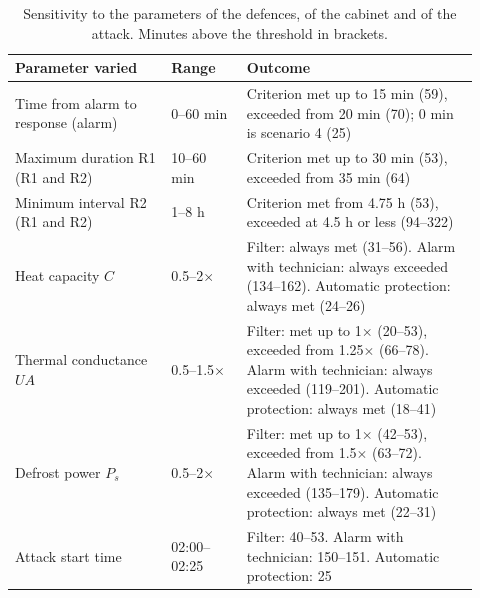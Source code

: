 \documentclass{ceurart}
\begin{document}
\begin{table}[ht]
  \caption{Sensitivity to the parameters of the defences, of the cabinet and of the attack. Minutes above the threshold in brackets.}
  \label{tab:sensitivity}
  \begin{tabular}{@{}p{0.31\linewidth}p{0.15\linewidth}p{0.46\linewidth}@{}}
    \toprule
    Parameter varied & Range & Outcome \\
    \midrule
    Time from alarm to response (alarm) & 0--60 min & Criterion met up to 15 min (59), exceeded from 20 min (70); 0 min is scenario 4 (25) \\
    Maximum duration R1 (R1 and R2) & 10--60 min & Criterion met up to 30 min (53), exceeded from 35 min (64) \\
    Minimum interval R2 (R1 and R2) & 1--8 h & Criterion met from 4.75 h (53), exceeded at 4.5 h or less (94--322) \\
    Heat capacity $C$ & 0.5--2$\times$ & Filter: always met (31--56). Alarm with technician: always exceeded (134--162). Automatic protection: always met (24--26) \\
    Thermal conductance $UA$ & 0.5--1.5$\times$ & Filter: met up to 1$\times$ (20--53), exceeded from 1.25$\times$ (66--78). Alarm with technician: always exceeded (119--201). Automatic protection: always met (18--41) \\
    Defrost power $P_s$ & 0.5--2$\times$ & Filter: met up to 1$\times$ (42--53), exceeded from 1.5$\times$ (63--72). Alarm with technician: always exceeded (135--179). Automatic protection: always met (22--31) \\
    Attack start time & 02:00--02:25 & Filter: 40--53. Alarm with technician: 150--151. Automatic protection: 25 \\
    \bottomrule
  \end{tabular}
\end{table}
\end{document}
